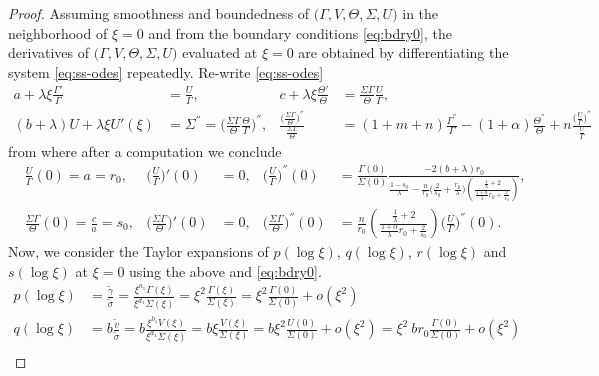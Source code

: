 \documentclass[a4paper,11pt]{article}
\def\blue{\color{blue}}
\def\tg{{\tilde{\gamma}}}
\def\tv{{\tilde{v}}}
\def\ts{{\tilde{\sigma}}}
\theoremstyle{remark}
\begin{document}
\begin{proof}
Assuming smoothness and boundedness of $\big(\Gamma,V,\Theta,\Sigma,U\big)$ in the neighborhood of $\xi=0$ and from the boundary conditions \eqref{eq:bdry0}, the derivatives of $\big(\Gamma,V,\Theta,\Sigma,U\big)$ evaluated at $\xi=0$ are obtained by differentiating the system \eqref{eq:ss-odes} repeatedly.
Re-write \eqref{eq:ss-odes}
\begin{align*}
  a + \lambda\xi\frac{\Gamma'}{\Gamma} &= \frac{U}{\Gamma}, &
  c + \lambda\xi\frac{\Theta'}{\Theta} &= \frac{\Sigma\Gamma}{\Theta} \frac{U}{\Gamma},\\
  (b+\lambda)U  + \lambda \xi U'(\xi) &= \Sigma^{''} = \Big(\frac{\Sigma\Gamma}{\Theta} \frac{\Theta}{\Gamma}\Big)^{''}, &
  \frac{\Big(\frac{\Sigma\Gamma}{\Theta}\Big)^{''}}{\frac{\Sigma\Gamma}{\Theta}} &= (1+m+n)\frac{\Gamma^{''}}{\Gamma}-(1+\alpha) \frac{\Theta^{''}}{\Theta} + n \frac{ \big(\frac{U}{\Gamma}\big)^{''}}{\frac{U}{\Gamma}}
\end{align*}
from where after a computation we conclude
\begin{align*}
&\frac{U}{\Gamma}(0) = a = r_0,  & \Big(\frac{U}{\Gamma}\Big)'(0)&=0, & \Big(\frac{U}{\Gamma}\Big)^{''}(0) &= \frac{\Gamma(0)}{\Sigma(0)} \frac{-2(b+\lambda)r_0}{\frac{1-s_0}{\lambda}-\frac{n}{r_0}\Big(\frac{2}{s_0} + \frac{r_0}{\lambda}\Big)\left(\frac{ \frac{1}{\lambda}+2}{ \frac{1+\alpha}{\lambda}r_0 + \frac{2}{s_0}}\right)},\\
&\frac{\Sigma\Gamma}{\Theta}(0) = \frac{c}{a} = s_0,  & \Big(\frac{\Sigma\Gamma}{\Theta}\Big)'(0)&=0, &
\Big(\frac{\Sigma\Gamma}{\Theta}\Big)^{''}(0) &= \frac{n}{r_0} \left(\frac{ \frac{1}{\lambda}+2 }{ \frac{1+\alpha}{\lambda}r_0 + \frac{2}{s_0}}\right)\Big(\frac{U}{\Gamma}\Big)^{''}(0).
\end{align*}
Now, we consider the Taylor expansions of $p(\log\xi)$, $q(\log\xi)$, $r(\log\xi)$ and $s(\log\xi)$ at $\xi=0$ using {\blue the above} and \eqref{eq:bdry0}.
\begin{align*}
 p(\log\xi) &= \frac{ \tg }{\ts} = \frac{ \xi^{a_1} \Gamma(\xi)}{\xi^{d_1} \Sigma(\xi)} = \xi^2\frac{\Gamma(\xi)}{\Sigma(\xi)} = \xi^2\frac{\Gamma(0)}{\Sigma(0)} + o(\xi^2) \\
 q(\log\xi) &= b\frac{\tv}{\ts} = b\frac{ \xi^{b_1} V(\xi) }{ \xi^{d_1} \Sigma(\xi)} = b\xi\frac{ V(\xi) }{ \Sigma(\xi)} = b\xi^2 \frac{U(0)}{\Sigma(0)}+ o(\xi^2)=\xi^2 ~br_0\frac{\Gamma(0)}{\Sigma(0)} + o(\xi^2) \\

\end{align*}
\end{proof}
\end{document}
